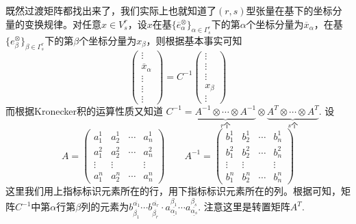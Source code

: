 既然过渡矩阵都找出来了，我们实际上也就知道了$(r,s)$型张量在基下的坐标分量的变换规律。对任意$x\in V^{r}_{s}$，设$x$在基$\{ \overline{e}^{\otimes}_{\alpha}\}_{\alpha\in \Gamma^{r}_{s}}$下的第$\alpha$个坐标分量为$\overline{x}_{\alpha}$，在基$\{e^{\otimes}_{\beta} \}_{\beta\in \Gamma^{r}_{s}} $下的第$\beta$个坐标分量为$x_{\beta}$，则根据基本事实可知
\[
\left( \begin{array}{ccccc}{\vdots} \\ {\overline{x}_{\alpha}}  \\ {\vdots} \\ {\vdots}\\ {\vdots}\end{array}\right)=C^{-1}\left( \begin{array}{ccccc}{\vdots} \\ {\vdots}  \\ {\vdots} \\ {x_{\beta}}\\ {\vdots}\end{array}\right)
\]
而根据Kronecker积的运算性质又知道
$
C^{-1}=\underbrace{A^{-1}\otimes \cdots \otimes A^{-1}}_{r\text{个}}\otimes \underbrace{A^{T}\otimes \cdots\otimes A^{T}}_{s\text{个}}
$.
设
\[
A=\left( \begin{array}{cccc}{a_{1}^{1}} & {a^{1}_{2}} & {\cdots} & {a^{1}_{ n}} \\ {a^{2}_{1}} & {a^{2}_{2}} & {\cdots} & {a^{2}_{ n}} \\ {\vdots} & {\vdots} & { } & {\vdots} \\ {a^{n}_{ 1}} & {a^{n}_{ 2}} & {\cdots} & {a^{n}_{ n}}\end{array}\right)\quad\quad A^{-1}=\left( \begin{array}{cccc}{b_{1}^{1}} & {b^{1}_{2}} & {\cdots} & {b^{1}_{ n}} \\ {b^{2}_{1}} & {b^{2}_{2}} & {\cdots} & {b^{2}_{ n}} \\ {\vdots} & {\vdots} & { } & {\vdots} \\ {b^{n}_{ 1}} & {b^{n}_{ 2}} & {\cdots} & {b^{n}_{ n}}\end{array}\right)
\]
这里我们用上指标标识元素所在的行，用下指标标识元素所在的列。根据可知，矩阵$C^{-1}$中第$\alpha$行第$\beta$列的元素为$b^{\overline{\alpha_{1}}}_{\overline{\beta_{ 1 }}}\cdots b^{\overline{\alpha_{r}}}_{\overline{\beta_{ r }}}\cdot a^{\underline{\beta_{ 1 }}}_{\underline{\alpha_{ 1 }}}\cdots a^{\underline{\beta_{ s }}}_{\underline{\alpha_{ s }}}$. 注意这里是转置矩阵$A^{T}$.
